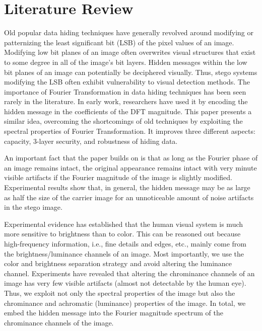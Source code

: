 \section{Literature Review}
\label{sec:LiteratureReview}
Old popular data hiding techniques have generally revolved around modifying or patternizing the least significant bit (LSB) of the pixel values of an image. Modifying low bit planes of an image often overwrites visual structures that exist to some degree in all of the image's bit layers. Hidden messages within the low bit planes of an image can potentially be deciphered visually. Thus, stego systems modifying the LSB often exhibit vulnerability to visual detection methods. The importance of Fourier Transformation in data hiding techniques has been seen rarely in the literature. In early work, researchers have used it by encoding the hidden message in the coefficients of the DFT magnitude. This paper presents a similar idea, overcoming the shortcomings of old techniques by exploiting the spectral properties of Fourier Transformation. It improves three different aspects: capacity, 3-layer security, and robustness of hiding data.

An important fact that the paper builds on is that as long as the Fourier phase of an image remains intact, the original appearance remains intact with very minute visible artifacts if the Fourier magnitude of the image is slightly modified. Experimental results show that, in general, the hidden message may be as large as half the size of the carrier image for an unnoticeable amount of noise artifacts in the stego image.

Experimental evidence has established that the human visual system is much more sensitive to brightness than to color. This can be reasoned out because high-frequency information, i.e., fine details and edges, etc., mainly come from the brightness/luminance channels of an image. Most importantly, we use the color and brightness separation strategy and avoid altering the luminance channel. Experiments have revealed that altering the chrominance channels of an image has very few visible artifacts (almost not detectable by the human eye). Thus, we exploit not only the spectral properties of the image but also the chrominance and achromatic (luminance) properties of the image. In total, we embed the hidden message into the Fourier magnitude spectrum of the chrominance channels of the image.

